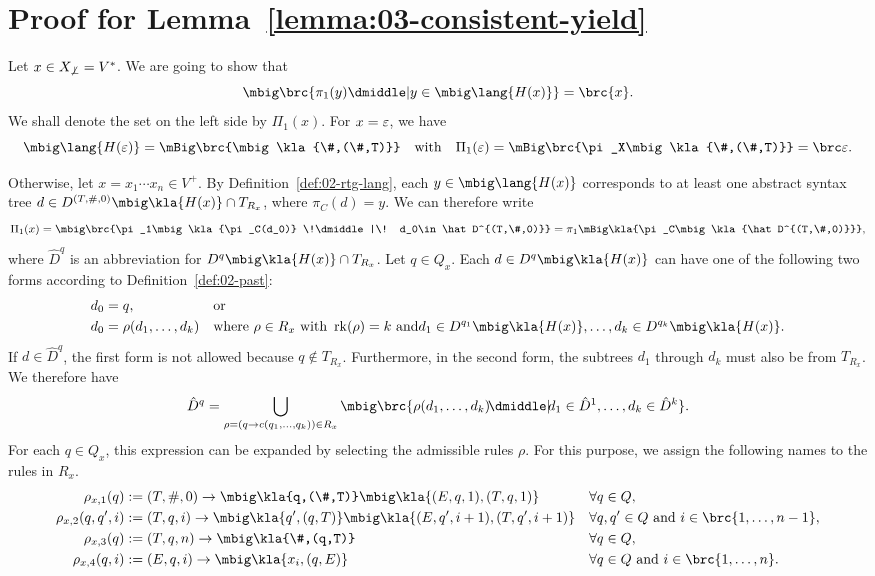 \section{Proof for Lemma~\ref{lemma:03-consistent-yield}}\label{appendix:03-consistent-yield}

Let $x\in X_{\not\bot} = V^*$. We are going to show that
\[
 \mbig\brc{\pi_1(y) \dmiddle| y\in\mbig\lang{H(x)}} = \brc{x}.
\]
We shall denote the set on the left side by $\Pi_1(x)$. For $x=\varepsilon$, we have
\[
 \mbig\lang{H(\eps)} = \mBig\brc{\mbig\kla{\#,(\#,T)}}
 \quad\text{with}\quad \Pi_1(\eps) = \mBig\brc{\pi_X\mbig\kla{\#,(\#,T)}} = \brc\eps.
\]

Otherwise, let $x = x_1\cdots x_n\in V^+$. By Definition~\ref{def:02-rtg-lang},
each $y\in\mbig\lang{H(x)}$ corresponds to at least one abstract syntax tree
$d\in D^{(T,\#,0)}\mbig\kla{H(x)}\cap T_{R_x}$, where $\pi_C(d) = y$. We can
therefore write
\[
 \Pi_1(x)
 = \mbig\brc{\pi_1\mbig\kla{\pi_C(d_0)} \!\dmiddle|\! d_0\in \hat D^{(T,\#,0)}}
 = \pi_1\mBig\kla{\pi_C\mbig\kla{\hat D^{(T,\#,0)}}},
\]
where $\hat D^q$ is an abbreviation for $D^q\mbig\kla{H(x)}\cap T_{R_x}$. Let
$q\in Q_x$. Each $d\in D^q\mbig\kla{H(x)}$ can have one of the following two
forms according to Definition~\ref{def:02-past}:
\begin{align*}
 d_0 &= q, &&\text{or} \\
 d_0 &= \rho(d_1,\ldots,d_k) &&\text{where~} \rho\in R_x \text{ with } \rk(\rho) = k \text{ and} d_1\in D^{q_1}\mbig\kla{H(x)}, \ldots, d_k\in D^{q_k}\mbig\kla{H(x)}.
\end{align*}
If $d\in \hat D^q$, the first form is not allowed because $ q\notin T_{R_x}$.
Furthermore, in the second form, the subtrees $d_1$ through $d_k$ must also be
from $T_{R_x}$. We therefore have
\[
 \hat D^q = \bigcup_{\rho=(q\to c(q_1,\ldots,q_k))\in R_x}
 \mbig\brc{\rho(d_1,\ldots,d_k) \!\dmiddle|\! d_1\in\hat D^1,\ldots, d_k\in\hat D^k}.
\]
For each $q\in Q_x$, this expression can be expanded by selecting the admissible
rules $\rho$. For this purpose, we assign the following names to the rules in $R_x$.
\begin{align*}
 \rho_{x,1}(q) &:= (T,\#,0) \to \mbig\kla{q,(\#,T)}\mbig\kla{(E,q,1),(T,q,1)} &&\forall q\in Q, \\
 \rho_{x,2}(q,q',i) &:= (T,q,i) \to \mbig\kla{q',(q,T)}\mbig\kla{(E,q',i+1),(T,q',i+1)} &&\forall q,q'\in Q \text{ and } i\in\brc{1,\ldots,n-1}, \\
 \rho_{x,3}(q) &:= (T,q,n) \to \mbig\kla{\#,(q,T)} &&\forall q\in Q, \\
 \rho_{x,4}(q,i) &:= (E,q,i) \to \mbig\kla{x_i,(q,E)} &&\forall q\in Q\text{ and } i\in\brc{1,\ldots,n}.
\end{align*}
